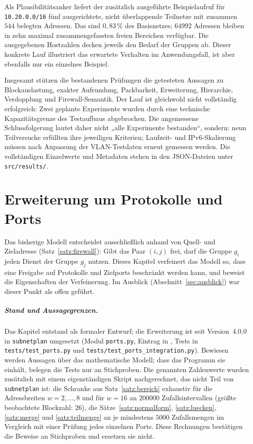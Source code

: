\documentclass[a4paper,12pt, twoside]{report}
\theoremstyle{definition}
\newcommand{\code}[1]{\texttt{\detokenize{#1}}}
\begin{document}
Als Plausibilitätsanker liefert der zusätzlich ausgeführte Beispielaufruf für \texttt{10.20.0.0/16} fünf ausgerichtete, nicht überlappende Teilnetze mit zusammen $544$ belegten Adressen. Das sind $0{,}83\,\%$ des Basisnetzes; $64992$ Adressen bleiben in zehn maximal zusammengefassten freien Bereichen verfügbar. Die ausgegebenen Hostzahlen decken jeweils den Bedarf der Gruppen ab. Dieser konkrete Lauf illustriert das erwartete Verhalten im Anwendungsfall, ist aber ebenfalls nur ein einzelnes Beispiel.

Insgesamt stützen die bestandenen Prüfungen die getesteten Aussagen zu Blockauslastung, exakter Aufrundung, Packbarkeit, Erweiterung, Hierarchie, Verdopplung und Firewall-Semantik. Der Lauf ist gleichwohl nicht vollständig erfolgreich: Zwei geplante Experimente wurden durch eine technische Kapazitätsgrenze des Testaufbaus abgebrochen. Die angemessene Schlussfolgerung lautet daher nicht „alle Experimente bestanden“, sondern: neun Teilversuche erfüllten ihre jeweiligen Kriterien; Laufzeit- und IPv6-Skalierung müssen nach Anpassung der VLAN-Testdaten erneut gemessen werden. Die vollständigen Einzelwerte und Metadaten stehen in den JSON-Dateien unter \texttt{src/results/}.

\chapter{Erweiterung um Protokolle und Ports}
\label{sec:ports}

Das bisherige Modell entscheidet ausschließlich anhand von Quell- und Zieladresse (Satz~\ref{satz:firewall}): Gibt \code{access} das Paar $(i,j)$ frei, darf die Gruppe $g_i$ jeden Dienst der Gruppe $g_j$ nutzen. Dieses Kapitel verfeinert das Modell so, dass eine Freigabe auf Protokolle und Zielports beschränkt werden kann, und beweist die Eigenschaften der Verfeinerung. Im Ausblick (Abschnitt~\ref{sec:ausblick}) war dieser Punkt als offen geführt.

\paragraph{Stand und Aussagegrenzen.} Das Kapitel entstand als formaler Entwurf; die Erweiterung ist seit Version~4.0.0 in \texttt{subnetplan} umgesetzt (Modul \texttt{ports.py}, Eintrag \code{\{to: Gruppe, ports: [\dots]\}} in \code{access}, Tests in \texttt{tests/test\_ports.py} und \texttt{tests/test\_ports\_integration.py}). Bewiesen werden Aussagen über das mathematische Modell; dass das Programm sie einhält, belegen die Tests nur an Stichproben. Die genannten Zahlenwerte wurden zusätzlich mit einem eigenständigen Skript nachgerechnet, das nicht Teil von \texttt{subnetplan} ist: die Schranke aus Satz~\ref{satz:bereich} exhaustiv für die Adressbreiten $w=2,\ldots,8$ und für $w=16$ an $200000$ Zufallsintervallen (größte beobachtete Blockzahl: $26$), die Sätze~\ref{satz:normalform}, \ref{satz:luecken}, \ref{satz:merge} und \ref{satz:teilmenge} an je mindestens $5000$ Zufallsmengen im Vergleich mit einer Prüfung jedes einzelnen Ports. Diese Rechnungen bestätigen die Beweise an Stichproben und ersetzen sie nicht.
\end{document}
